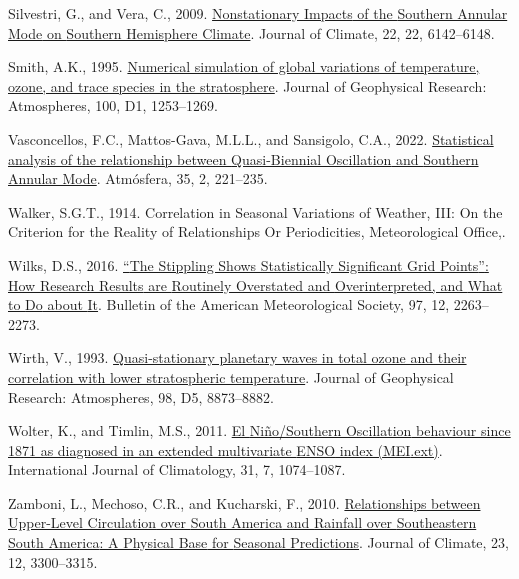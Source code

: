 \documentclass[12pt,oneside]{reedthesis}
\newlength{\cslhangindent}
\newenvironment{CSLReferences}[2] %
 {%
  \setlength{\parindent}{0pt}
  \ifodd #1 \everypar{\setlength{\hangindent}{\cslhangindent}}\ignorespaces\fi
  \ifnum #2 > 0
  \setlength{\parskip}{#2\baselineskip}
  \fi
 }%
 {}
\begin{document}
\begin{CSLReferences}{1}{0}
\leavevmode{}%
Silvestri, G., and Vera, C., 2009. \href{https://doi.org/10.1175/2009JCLI3036.1}{Nonstationary {Impacts} of the {Southern Annular Mode} on {Southern Hemisphere Climate}}. Journal of Climate, 22, 22, 6142--6148.

\leavevmode{}%
Smith, A.K., 1995. \href{https://doi.org/10.1029/94JD02395}{Numerical simulation of global variations of temperature, ozone, and trace species in the stratosphere}. Journal of Geophysical Research: Atmospheres, 100, D1, 1253--1269.

\leavevmode{}%
Vasconcellos, F.C., Mattos-Gava, M.L.L., and Sansigolo, C.A., 2022. \href{https://doi.org/10.20937/ATM.52910}{Statistical analysis of the relationship between {Quasi-Biennial Oscillation} and {Southern Annular Mode}}. Atmósfera, 35, 2, 221--235.

\leavevmode{}%
Walker, S.G.T., 1914. Correlation in {Seasonal Variations} of {Weather}, {III}: {On} the {Criterion} for the {Reality} of {Relationships Or Periodicities}, {Meteorological Office},.

\leavevmode{}%
Wilks, D.S., 2016. \href{https://doi.org/10.1175/BAMS-D-15-00267.1}{{``{The Stippling Shows Statistically Significant Grid Points}''}: {How Research Results} are {Routinely Overstated} and {Overinterpreted}, and {What} to {Do} about {It}}. Bulletin of the American Meteorological Society, 97, 12, 2263--2273.

\leavevmode{}%
Wirth, V., 1993. \href{https://doi.org/10.1029/92JD02820}{Quasi-stationary planetary waves in total ozone and their correlation with lower stratospheric temperature}. Journal of Geophysical Research: Atmospheres, 98, D5, 8873--8882.

\leavevmode{}%
Wolter, K., and Timlin, M.S., 2011. \href{https://doi.org/10.1002/joc.2336}{El {Niño}/{Southern Oscillation} behaviour since 1871 as diagnosed in an extended multivariate {ENSO} index ({MEI}.ext)}. International Journal of Climatology, 31, 7, 1074--1087.

\leavevmode{}%
Zamboni, L., Mechoso, C.R., and Kucharski, F., 2010. \href{https://doi.org/10.1175/2009JCLI3129.1}{Relationships between {Upper-Level Circulation} over {South America} and {Rainfall} over {Southeastern South America}: {A Physical Base} for {Seasonal Predictions}}. Journal of Climate, 23, 12, 3300--3315.

\end{CSLReferences}


\end{document}
